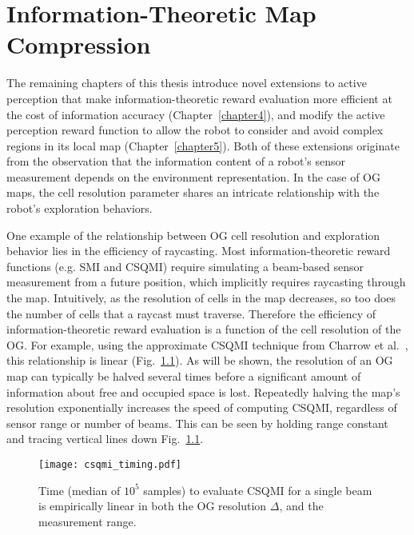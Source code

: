 \chapter{Information-Theoretic Map Compression}
\label{chapter3}

The remaining chapters of this thesis introduce novel extensions to active perception
that make information-theoretic reward evaluation more
efficient at the cost of information accuracy (Chapter~\ref{chapter4}), and
modify the active perception reward function to allow the
robot to consider and avoid complex regions
in its local map (Chapter~\ref{chapter5}). Both
of these extensions originate from the observation that the information content
of a robot's sensor measurement depends on the environment
representation. In the case of OG maps, the cell resolution parameter shares an
intricate relationship with the robot's exploration behaviors.

One example of the relationship between OG cell resolution and exploration
behavior lies in the efficiency of raycasting. Most information-theoretic reward
functions (e.g. SMI and CSQMI) require simulating a beam-based sensor measurement from a future
position, which implicitly requires raycasting through the map. Intuitively, as
the resolution of cells in the map decreases, so too does the number of cells
that a raycast must traverse. Therefore the efficiency of information-theoretic reward evaluation
is a function of the cell resolution of the OG. For example, using the approximate
CSQMI technique from Charrow et al.~\cite{charrow2015icra}, this relationship is linear
(Fig.~\ref{fig:csqmi_timing}). As will be shown, the resolution of an OG map can typically be halved several
times before a significant amount of information about free and occupied space
is lost. Repeatedly halving the map's resolution exponentially increases the
speed of computing CSQMI, regardless of sensor range or number of beams. This
can be seen by holding range constant and tracing vertical lines down Fig.~\ref{fig:csqmi_timing}.

\begin{figure}
  \centering
  \texttt{[image: csqmi\_timing.pdf]}
  \caption[Time complexity of computing CSQMI for a varying map resolution.]{Time (median of $10^5$ samples)
    to evaluate CSQMI for a single beam is empirically linear in both the OG resolution $\Delta$, and
  the measurement range. \label{fig:csqmi_timing}}
\end{figure}

